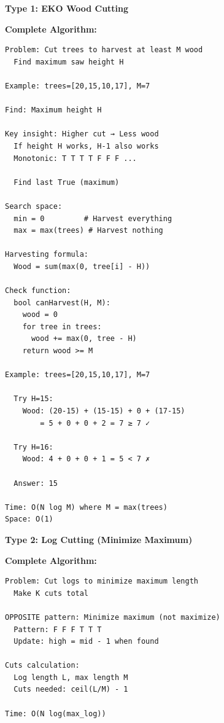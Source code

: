 \documentclass[11pt,a4paper,oneside]{book}
\begin{document}
\begin{tcolorbox}[
    enhanced,breakable,
    colback=successgreen!10,
    colframe=successgreen,
    boxrule=1.5pt,
    arc=3mm,
    title=\textbf{Complete Wood Cutting Algorithms}
]
\textbf{Type 1: EKO Wood Cutting}

\textbf{Complete Algorithm:}
\begin{verbatim}
Problem: Cut trees to harvest at least M wood
  Find maximum saw height H
  
Example: trees=[20,15,10,17], M=7
  
Find: Maximum height H

Key insight: Higher cut → Less wood
  If height H works, H-1 also works
  Monotonic: T T T T F F F ...
  
  Find last True (maximum)

Search space:
  min = 0         # Harvest everything
  max = max(trees) # Harvest nothing

Harvesting formula:
  Wood = sum(max(0, tree[i] - H))

Check function:
  bool canHarvest(H, M):
    wood = 0
    for tree in trees:
      wood += max(0, tree - H)
    return wood >= M

Example: trees=[20,15,10,17], M=7
  
  Try H=15:
    Wood: (20-15) + (15-15) + 0 + (17-15)
        = 5 + 0 + 0 + 2 = 7 ≥ 7 ✓
  
  Try H=16:
    Wood: 4 + 0 + 0 + 1 = 5 < 7 ✗
  
  Answer: 15

Time: O(N log M) where M = max(trees)
Space: O(1)
\end{verbatim}

\textbf{Type 2: Log Cutting (Minimize Maximum)}

\textbf{Complete Algorithm:}
\begin{verbatim}
Problem: Cut logs to minimize maximum length
  Make K cuts total
  
OPPOSITE pattern: Minimize maximum (not maximize)
  Pattern: F F F T T T
  Update: high = mid - 1 when found

Cuts calculation:
  Log length L, max length M
  Cuts needed: ceil(L/M) - 1

Time: O(N log(max_log))
\end{verbatim}
\end{tcolorbox}
\end{document}
